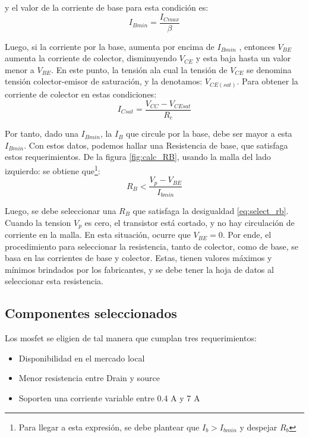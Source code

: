y el valor de la corriente de base para esta condición es: 
\begin{equation}
	I_{Bmin} = \frac{I_{Cmax}}{\beta}
\end{equation}

Luego, si la corriente por la base, aumenta por encima de $I_{Bmin}$ , entonces $V_{BE} $ aumenta la corriente de colector, disminuyendo $V_{CE}$   y esta baja hasta un valor menor a $V_{BE}$. En este punto, la tensión ala cual la tensión de $V_{CE}$ se denomina tensión colector-emisor de saturación, y la denotamos: $V_{CE(sat)}$. Para obtener la corriente de colector en estas condiciones: 
\begin{equation}
	I_{Csat} = \frac{V_{CC}- V_{CEsat}}{R_c} 
\end{equation}

Por tanto, dado una $I_{Bmin}$, la $I_{B}$ que circule por la base, debe ser mayor a esta $I_{Bmin}$. Con estos datos, podemos hallar una Resistencia de base, que satisfaga estos requerimientos. De la figura \ref{fig:calc_RB}, usando la malla del lado izquierdo:
se obtiene que\footnote{Para llegar a esta expresión, se debe plantear que $I_{b}>I_{bmin}$ y despejar $R_b$}: 
\begin{equation} \label{eq:select_rb}
	R_B < \frac{V_p-V_{BE}}{I_{bmin}}
\end{equation} 

Luego, se debe seleccionar una $R_B$ que satisfaga la desigualdad \ref{eq:select_rb}.  
Cuando la tension $V_p$ es cero, el transistor está cortado, y no hay circulación de corriente en la malla. En esta situación, ocurre que $V_{BE}=0$. Por ende, el procedimiento para seleccionar la resistencia, tanto de colector, como de base, se basa en las corrientes de base y colector. Estas, tienen valores máximos y mínimos brindados por los fabricantes, y se debe tener la hoja de datos al seleccionar esta resistencia. 

\subsection{Componentes seleccionados} 


Los mosfet se eligien de tal manera que cumplan tres requerimientos:
\begin{itemize}
	\item Disponibilidad en el mercado local 
	\item Menor resistencia entre Drain y source 
	\item Soporten una corriente variable entre 0.4 A y 7 A   
	
\end{itemize}
 
